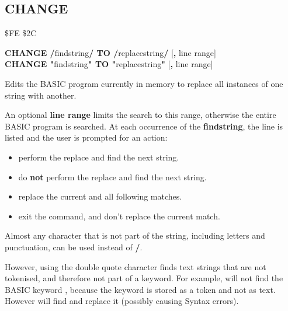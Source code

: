 \newpage
\subsection{CHANGE}
\begin{description}[leftmargin=2cm,style=nextline]
\item [Token:]    \$FE \$2C

\item [Format:]   {\bf CHANGE /}findstring{\bf/ TO /}replacestring{\bf/} [{\bf,} line range] \\
            		{\bf CHANGE "}findstring{\bf" TO "}replacestring{\bf"} [{\bf,} line range]

\item [Usage:]    Edits the BASIC program currently in memory to replace all instances of one string with another.

                  An optional {\bf line range} limits the search to this range, otherwise the entire BASIC program is searched. At each occurrence of the {\bf findstring}, the line is listed and the user is prompted for an action:
                  \begin{itemize}
                     \item {}  perform the replace and find the next string.
                     \item {}  do {\bf not} perform the replace and find the next string.
                     \item \megakey{*}  replace the current and all following matches.
                     \item {} exit the command, and don't replace the current match.
                  \end{itemize}

                  \item [Remarks:]  Almost any character that is not part of the string, including letters and punctuation, can be used instead of {\bf /}.

                  However, using the double quote character finds text strings that are not tokenised, and therefore not part of a keyword. For example,  will not find the BASIC keyword , because the keyword is stored as a token and not as text. However  will find and replace it (possibly causing Syntax errors).


\end{description}
